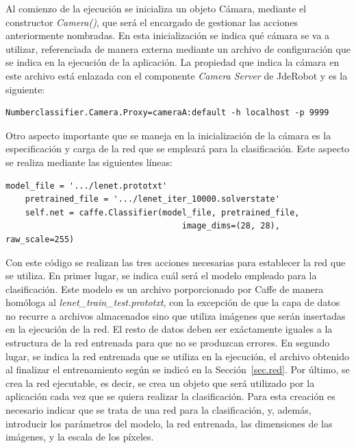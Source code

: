 Al comienzo de la ejecución se inicializa un objeto Cámara, mediante el constructor \textit{Camera()}, que será el encargado de gestionar las acciones anteriormente nombradas. En esta inicialización se indica qué cámara se va a utilizar, referenciada de manera externa mediante un archivo de configuración que se indica en la ejecución de la aplicación. La propiedad que indica la cámara en este archivo está enlazada con el componente \textit{Camera Server} de JdeRobot y es la siguiente:
\vspace{10pt}
\begin{lstlisting}[frame=single]
	Numberclassifier.Camera.Proxy=cameraA:default -h localhost -p 9999
\end{lstlisting}

Otro aspecto importante que se maneja en la inicialización de la cámara es la especificación y carga de la red que se empleará para la clasificación. Este aspecto se realiza mediante las siguientes líneas:
\vspace{10pt}
\begin{lstlisting}[frame=single]
	model_file = '.../lenet.prototxt'
	pretrained_file = '.../lenet_iter_10000.solverstate'
	self.net = caffe.Classifier(model_file, pretrained_file, 
									image_dims=(28, 28), raw_scale=255)
\end{lstlisting}

Con este código se realizan las tres acciones necesarias para establecer la red que se utiliza. En primer lugar, se indica cuál será el modelo empleado para la clasificación. Este modelo es un archivo porporcionado por Caffe de manera homóloga al \textit{lenet\_train\_test.prototxt}, con la excepción de que la capa de datos no recurre a archivos almacenados sino que utiliza imágenes que serán insertadas en la ejecución de la red. El resto de datos deben ser exáctamente iguales a la estructura de la red entrenada para que no se produzcan errores. En segundo lugar, se indica la red entrenada que se utiliza en la ejecución, el archivo obtenido al finalizar el entrenamiento según se indicó en la Sección~\ref{sec.red}. Por último, se crea la red ejecutable, es decir, se crea un objeto que será utilizado por la aplicación cada vez que se quiera realizar la clasificación. Para esta creación es necesario indicar que se trata de una red para la clasificación, y, además, introducir los parámetros del modelo, la red entrenada, las dimensiones de las imágenes, y la escala de los píxeles.\\

